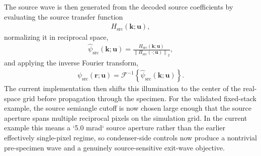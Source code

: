 \documentclass[11pt]{article}
\begin{document}
The source wave is then generated from the decoded source coefficients by evaluating the
source transfer function
\begin{align}
  H_{\mathrm{src}}(\mathbf{k};\mathbf{u}),
\end{align}
normalizing it in reciprocal space,
\begin{align}
  \widehat{\psi}_{\mathrm{src}}(\mathbf{k};\mathbf{u})
  =
  \frac{H_{\mathrm{src}}(\mathbf{k};\mathbf{u})}
       {\left\lVert H_{\mathrm{src}}(\cdot;\mathbf{u}) \right\rVert_2},
\end{align}
and applying the inverse Fourier transform,
\begin{align}
  \psi_{\mathrm{src}}(\mathbf{r};\mathbf{u})
  = \mathcal{F}^{-1}\!\left\{
      \widehat{\psi}_{\mathrm{src}}(\mathbf{k};\mathbf{u})
    \right\}.
\end{align}
The current implementation then shifts this illumination to the center of the real-space
grid before propagation through the specimen.
For the validated fixed-stack example, the source semiangle cutoff is now chosen large
enough that the source aperture spans multiple reciprocal pixels on the simulation
grid.  In the current example this means a `5.0 mrad` source aperture rather than the
earlier effectively single-pixel regime, so condenser-side controls now produce a
nontrivial pre-specimen wave and a genuinely source-sensitive exit-wave objective.
\end{document}
